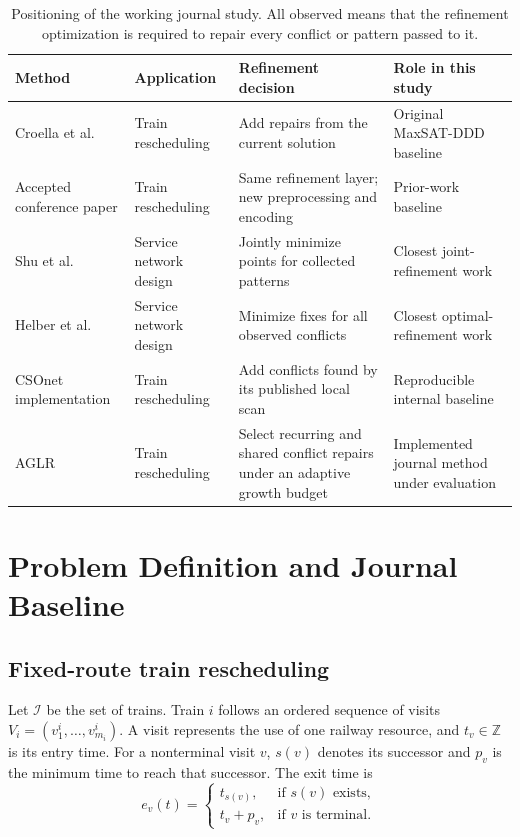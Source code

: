 \documentclass[preprint,12pt,authoryear]{elsarticle}
\begin{document}
\begin{table}[htbp]
\centering
\caption{Positioning of the working journal study. All observed means that the
refinement optimization is required to repair every conflict or pattern passed
to it.}
\label{tab:positioning}
\footnotesize
\begin{tabularx}{\textwidth}{@{}p{30mm}p{25mm}p{45mm}X@{}}
\toprule
Method & Application & Refinement decision & Role in this study \\
\midrule
Croella et al. & Train rescheduling & Add repairs from the current solution &
Original MaxSAT-DDD baseline \\
Accepted conference paper & Train rescheduling & Same refinement layer; new
preprocessing and encoding & Prior-work baseline \\
Shu et al. & Service network design & Jointly minimize points for collected
patterns & Closest joint-refinement work \\
Helber et al. & Service network design & Minimize fixes for all observed
conflicts & Closest optimal-refinement work \\
CSOnet implementation & Train rescheduling & Add conflicts found by its
published local scan & Reproducible internal baseline \\
AGLR & Train rescheduling & Select recurring and shared conflict repairs under
an adaptive growth budget & Implemented journal method under evaluation \\
\bottomrule
\end{tabularx}
\end{table}

\section{Problem Definition and Journal Baseline}
\label{sec:problem}

\subsection{Fixed-route train rescheduling}

Let $\mathcal I$ be the set of trains. Train $i$ follows an ordered sequence of
visits $V_i=(v^i_1,\ldots,v^i_{m_i})$. A visit represents the use of one railway
resource, and $t_v\in\mathbb Z$ is its entry time. For a nonterminal visit $v$,
$s(v)$ denotes its successor and $p_v$ is the minimum time to reach that
successor. The exit time is
\begin{equation}
e_v(t)=
\begin{cases}
t_{s(v)}, & \text{if }s(v)\text{ exists},\\
t_v+p_v, & \text{if }v\text{ is terminal}.
\end{cases}
\label{eq:exit-time}
\end{equation}
\end{document}
